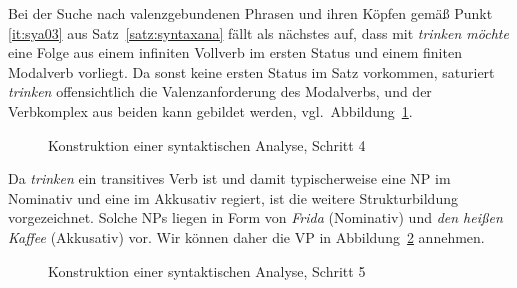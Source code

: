 Bei der Suche nach valenzgebundenen Phrasen und ihren Köpfen gemäß Punkt \ref{it:sya03} aus Satz~\ref{satz:syntaxana} fällt als nächstes auf, dass mit \textit{trinken möchte} eine Folge aus einem infiniten Vollverb im ersten Status und einem finiten Modalverb vorliegt.
Da sonst keine ersten Status im Satz vorkommen, saturiert \textit{trinken} offensichtlich die Valenzanforderung des Modalverbs, und der Verbkomplex aus beiden kann gebildet werden, vgl.\ Abbildung~\ref{fig:sya04}.

\begin{figure}[!htbp]
  \caption{Konstruktion einer syntaktischen Analyse, Schritt 4}
  \label{fig:sya04}
\end{figure}

Da \textit{trinken} ein transitives Verb ist und damit typischerweise eine NP im Nominativ und eine im Akkusativ regiert, ist die weitere Strukturbildung vorgezeichnet.
Solche NPs liegen in Form von \textit{Frida} (Nominativ) und \textit{den heißen Kaffee} (Akkusativ) vor.
Wir können daher die VP in Abbildung~\ref{fig:sya05} annehmen.

\begin{figure}[!htbp]
  \caption{Konstruktion einer syntaktischen Analyse, Schritt 5}
  \label{fig:sya05}
\end{figure}

